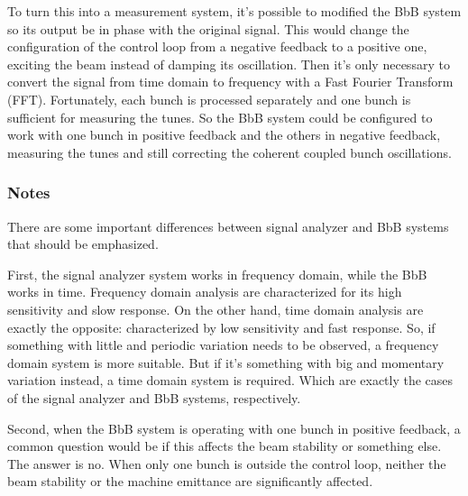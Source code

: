 To turn this into a measurement system, it's possible to modified the BbB system so its output be in phase with the original signal. This would change the configuration of the control loop from a negative feedback to a positive one, exciting the beam instead of damping its oscillation. Then it's only necessary to convert the signal from time domain to frequency with a Fast Fourier Transform (FFT). Fortunately, each bunch is processed separately and one bunch is sufficient for measuring the tunes. So the BbB system could be configured to work with one bunch in positive feedback and the others in negative feedback, measuring the tunes and still correcting the coherent coupled bunch oscillations.

\subsubsection{Notes}
There are some important differences between signal analyzer and BbB systems that should be emphasized.

First, the signal analyzer system works in frequency domain, while the BbB works in time. Frequency domain analysis are characterized for its high sensitivity and slow response. On the other hand, time domain analysis are exactly the opposite: characterized by low sensitivity and fast response. So, if something with little and periodic variation needs to be observed, a frequency domain system is more suitable. But if it's something with big and momentary variation instead, a time domain system is required. Which are exactly the cases of the signal analyzer and BbB systems, respectively.

Second, when the BbB system is operating with one bunch in positive feedback, a common question would be if this affects the beam stability or something else. The answer is no. When only one bunch is outside the control loop, neither the beam stability or the machine emittance are significantly affected.

\pagebreak